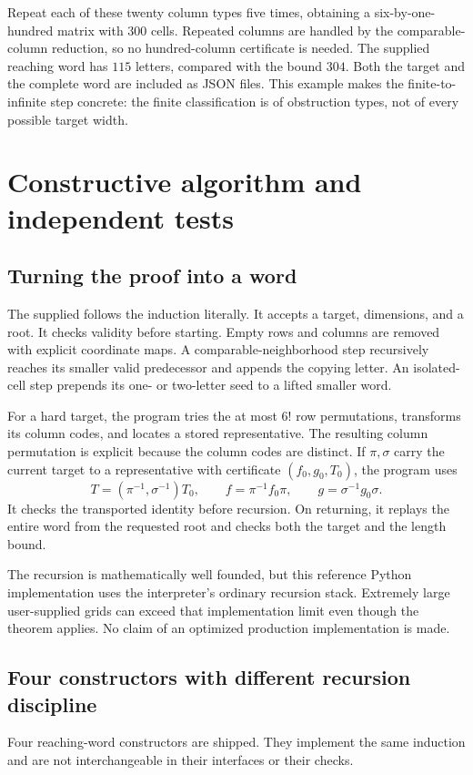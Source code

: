 \documentclass[11pt,letterpaper]{article}
\numberwithin{equation}{section}
\theoremstyle{definition}
\theoremstyle{remark}
\newcommand{\code}[1]{\texttt{\detokenize{#1}}}
\begin{document}
Repeat each of these twenty column types five times, obtaining a six-by-one-
hundred matrix with $300$ cells. Repeated columns are handled by the
comparable-column reduction, so no hundred-column certificate is needed.
The supplied reaching word has $115$ letters, compared with the bound
$304$. Both the target and the complete word are included as JSON files.
This example makes the finite-to-infinite step concrete: the finite
classification is of obstruction types, not of every possible target width.

\section{Constructive algorithm and independent tests}
\label{sec:algorithm}

\subsection{Turning the proof into a word}
The supplied \code{construct.py} follows the induction literally. It
accepts a target, dimensions, and a root. It checks validity before starting.
Empty rows and columns are removed with explicit coordinate maps. A
comparable-neighborhood step recursively reaches its smaller valid
predecessor and appends the copying letter. An isolated-cell step prepends
its one- or two-letter seed to a lifted smaller word.

For a hard target, the program tries the at most $6!$ row permutations,
transforms its column codes, and locates a stored representative. The
resulting column permutation is explicit because the column codes are
distinct. If $\pi,\sigma$ carry the current target to a representative
with certificate $(f_0,g_0,T_0)$, the program uses
\[
 T=(\pi^{-1},\sigma^{-1})T_0,\qquad
 f=\pi^{-1}f_0\pi,\qquad g=\sigma^{-1}g_0\sigma.
\]
It checks the transported identity before recursion. On returning, it
replays the entire word from the requested root and checks both the target
and the length bound.

The recursion is mathematically well founded, but this reference Python
implementation uses the interpreter's ordinary recursion stack. Extremely
large user-supplied grids can exceed that implementation limit even though
the theorem applies. No claim of an optimized production implementation is
made.

\subsection{Four constructors with different recursion discipline}
\label{sec:constructors}
Four reaching-word constructors are shipped. They implement the same
induction and are not interchangeable in their interfaces or their checks.
\end{document}

